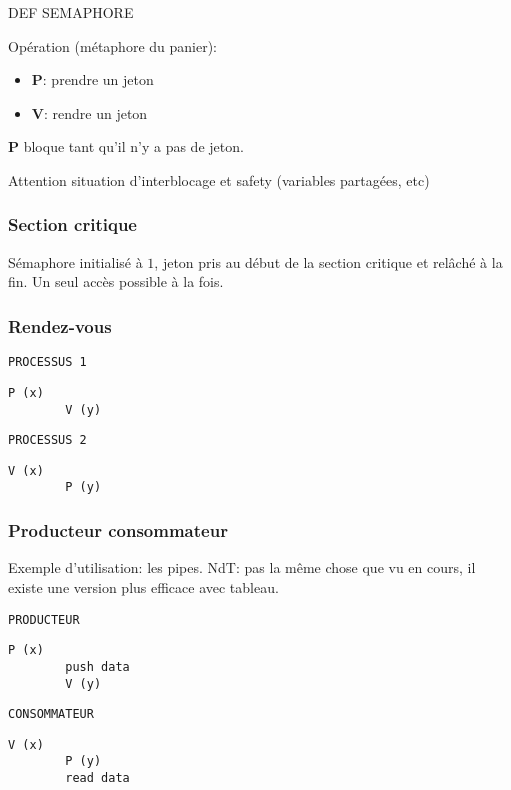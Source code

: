 \documentclass[10pt,twocolumn,a4paper]{article}
\begin{document}
DEF SEMAPHORE

Opération (métaphore du panier): 
\begin{itemize} 
    \item \textbf{P}: prendre un jeton
    \item \textbf{V}: rendre un jeton
\end{itemize}

\textbf{P} bloque tant qu'il n'y a pas de jeton. 

Attention situation d'interblocage et safety (variables partagées, etc)

\subsubsection{Section critique}

Sémaphore initialisé à $1$, jeton pris au début de la section critique et relâché à la fin. Un seul accès possible à la fois. 

\subsubsection{Rendez-vous}

\begin{multicols}{2}
    \texttt{PROCESSUS 1}
    \begin{lstlisting}[xleftmargin=-1cm]
        P (x)
        V (y)
    \end{lstlisting}

    \columnbreak{}
    
    \texttt{PROCESSUS 2}
    \begin{lstlisting}[xleftmargin=-1cm]
        V (x)
        P (y)
    \end{lstlisting}
\end{multicols}

\subsubsection{Producteur consommateur}

Exemple d'utilisation: les pipes.
{NdT}: pas la même chose que vu en cours, il existe une version plus efficace avec tableau.

\begin{multicols}{2}
    \texttt{PRODUCTEUR}
    \begin{lstlisting}[xleftmargin=-1cm]
        P (x) 
        push data
        V (y)
    \end{lstlisting}
    \columnbreak{}
    \texttt{CONSOMMATEUR}
    \hspace{0cm}
    \begin{lstlisting}[xleftmargin=-1cm]
        V (x) 
        P (y) 
        read data
    \end{lstlisting}
\end{multicols}
\end{document}
